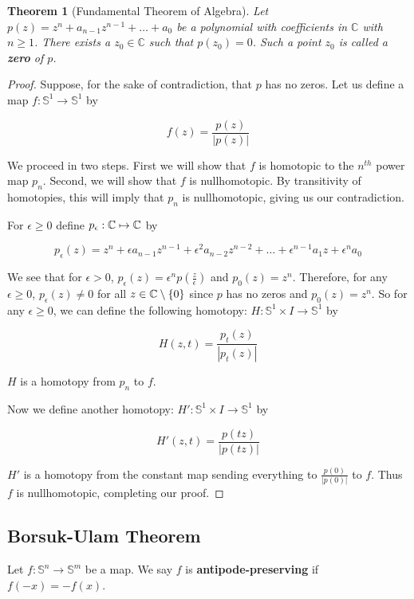 \documentclass[a4paper]{article}
\newtheorem{theorem}{Theorem}
\numberwithin{theorem}{section}
\begin{document}
\begin{theorem}[Fundamental Theorem of Algebra]
Let $p(z) = z^n + a_{n-1} z^{n-1} + \dots + a_0$ be a polynomial with coefficients in $\mathbb{C}$ with $n \geq 1$. There exists a $z_0 \in \mathbb{C}$ such that $p(z_0) = 0$. Such a point $z_0$ is called a \textbf{zero} of $p$.
\end{theorem}
\begin{proof}
Suppose, for the sake of contradiction, that $p$ has no zeros. Let us define a map $f: \mathbb{S}^1 \rightarrow \mathbb{S}^1$ by

$$ f(z) = \frac{p(z)}{|p(z)|} $$

We proceed in two steps. First we will show that $f$ is homotopic to the $n^{th}$ power map $p_n$. Second, we will show that $f$ is nullhomotopic. By transitivity of homotopies, this will imply that $p_n$ is nullhomotopic, giving us our contradiction.

For $\epsilon \geq 0$ define $p_{\epsilon}: \Bbb{C} \mapsto \Bbb{C}$ by

$$p_\epsilon(z) = z^n + \epsilon a_{n-1}z^{n-1} + \epsilon^2 a_{n-2}z^{n-2} + \dots + \epsilon^{n-1}a_1 z + \epsilon^{n} a_0$$

We see that for $\epsilon > 0$, $p_\epsilon(z) = \epsilon^n p(\frac{z}{\epsilon})$ and $p_0(z) = z^n$. Therefore, for any $\epsilon \geq 0$, $p_\epsilon(z) \neq 0$ for all $z \in \Bbb{C} \setminus \{0\}$ since $p$ has no zeros and $p_0(z) = z^n$. So for any $\epsilon \geq 0$, we can define the following homotopy: $H: \mathbb{S}^1 \times I \rightarrow \mathbb{S}^1$ by

$$ H(z,t) = \frac{p_t(z)}{|p_t(z)|} $$


$H$ is a homotopy from $p_n$ to $f$.

Now we define another homotopy: $H': \mathbb{S}^1 \times I \rightarrow \mathbb{S}^1$ by

$$ H'(z,t) = \frac{p(tz)}{|p(tz)|} $$

$H'$ is a homotopy from the constant map sending everything to $\frac{p(0)}{|p(0)|}$ to $f$. Thus $f$ is nullhomotopic, completing our proof.
\end{proof}

\subsection{Borsuk-Ulam Theorem}
Let $f: \mathbb{S}^n \rightarrow \mathbb{S}^m$ be a map. We say $f$ is \textbf{antipode-preserving} if $f(-x) = -f(x)$.
\end{document}
